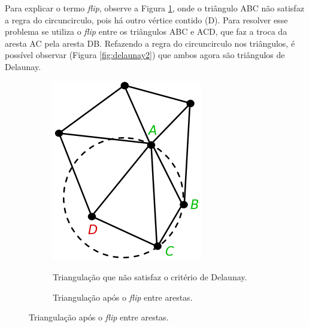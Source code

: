 Para explicar o termo \textit{flip}, observe a Figura \ref{fig:delaunay1}, onde o triângulo ABC não satisfaz a regra do circuncirculo, pois há outro vértice contido (D).
Para resolver esse problema se utiliza o \textit{flip} entre os triângulos ABC e ACD, que faz a troca da aresta AC pela aresta DB. 
Refazendo a regra do circuncirculo nos triângulos, é possível observar (Figura \ref{fig:delaunay2}) que ambos agora são triângulos de Delaunay.

\begin{figure}[H]
    \centering
    \begin{subfigure}[t]{0.3\textwidth}
        \caption{Triangulação que não satisfaz o critério de Delaunay.}
        \includegraphics[width=\textwidth]{dados/figuras/delaunay1.png}
        \label{fig:delaunay1}
    \end{subfigure}
    \hspace{3em}
    \begin{subfigure}[t]{0.3\textwidth}
        \caption{Triangulação após o \textit{flip} entre arestas.}

\end{subfigure}
\end{figure}
